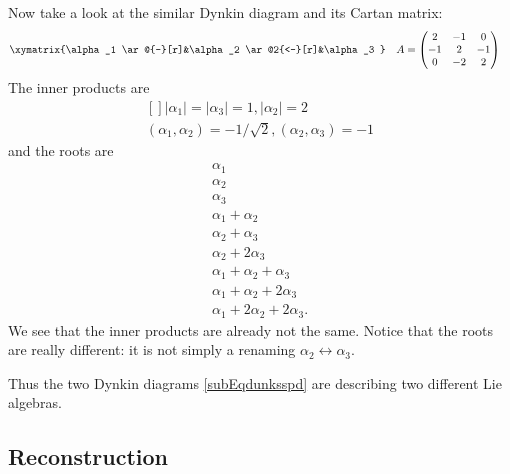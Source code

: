 Now take a look at the similar Dynkin diagram and its Cartan matrix:
\begin{subequations}
    \begin{align}
        \xymatrix{%
        \alpha_1 \ar@{-}[r]&\alpha_2 \ar@2{<-}[r]&\alpha_3
        }   &
        &A&=\begin{pmatrix}
            2    &   -1    &   0    \\
            -1    &   2    &   -1    \\
            0    &   -2    &   2
       \end{pmatrix}
    \end{align}
\end{subequations}
The inner products are
\begin{equation}
    \begin{aligned}[]
        | \alpha_1 |=|\alpha_3|=1, | \alpha_2 |=2 \\
        (\alpha_1,\alpha_2)=-1/\sqrt{2},(\alpha_2,\alpha_3)=-1
    \end{aligned}
\end{equation}
and the roots are
\begin{subequations}
    \begin{align}
        \alpha_1\\
        \alpha_2\\
        \alpha_3\\
        \alpha_1+\alpha_2\\
        \alpha_2+\alpha_3\\
        \alpha_2+2\alpha_3\\
        \alpha_1+\alpha_2+\alpha_3\\
        \alpha_1+\alpha_2+2\alpha_3\\
        \alpha_1+2\alpha_2+2\alpha_3.
    \end{align}
\end{subequations}
We see that the inner products are already not the same. Notice that the roots are really different: it is not simply a renaming \( \alpha_2\leftrightarrow \alpha_3\).

Thus the two Dynkin diagrams \eqref{subEqdunksspd} are describing two different Lie algebras.


\subsection{Reconstruction}

